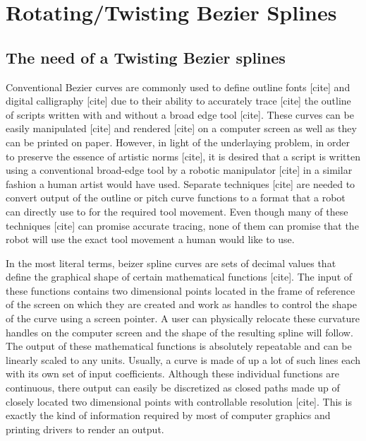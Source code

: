 \section{Rotating/Twisting Bezier Splines}
\label{Chapter:SplineModelling}

    \subsection{The need of a Twisting Bezier splines}
    Conventional Bezier curves are commonly used to define outline fonts [cite] and digital calligraphy [cite] due to their ability to accurately trace [cite] the outline of scripts written with and without a broad edge tool [cite]. These curves can be easily manipulated [cite] and rendered [cite] on a computer screen as well as they can be printed on paper. However, in light of the underlaying problem, in order to preserve the essence of artistic norms [cite], it is desired that a script is written using a conventional broad-edge tool by a robotic manipulator [cite] in a similar fashion a human artist would have used. Separate techniques [cite] are needed to convert output of the outline or pitch curve functions to a format that a robot can directly use to for the required tool movement. Even though many of these techniques [cite] can promise accurate tracing, none of them can promise that the robot will use the exact tool movement a human would like to use.

    In the most literal terms, beizer spline curves are sets of decimal values that define the graphical shape of certain mathematical functions [cite]. The input of these functions contains two dimensional points located in the frame of reference of the screen on which they are created and work as handles to control the shape of the curve using a screen pointer. A user can physically relocate these curvature handles on the computer screen and the shape of the resulting spline will follow. The output of these mathematical functions is absolutely repeatable and can be linearly scaled to any units. Usually, a curve is made of up a lot of such lines each with its own set of input coefficients. Although these individual functions are continuous, there output can easily be discretized as closed paths made up of closely located two dimensional points with controllable resolution [cite]. This is exactly the kind of information required by most of computer graphics and printing drivers to render an output.

